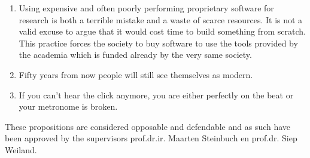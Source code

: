 \documentclass[10pt]{article}%
\newcommand{\mystelling}[1]{%
\item #1
}%
\begin{document}
\begin{enumerate}
\mystelling{Using expensive and often poorly performing proprietary software for research 
is both a terrible mistake and a waste of scarce resources. It is not a valid excuse to 
argue that it would cost time to build something from scratch. This practice forces the
society to buy software to use the tools provided by the academia which is funded already by 
the very same society.}

\mystelling{Fifty years from now people will still see themselves as modern.}

\mystelling{If you can't hear the click anymore, you are either perfectly on the beat or your metronome is broken.}

\end{enumerate}

%
%
%

\vfill \noindent These propositions are considered opposable and defendable and as such have been approved by the supervisors 
prof.dr.ir. Maarten Steinbuch en prof.dr. Siep Weiland.
\newpage

%
%
%
%
%
%
%
%
%
%
%
%
%
%
%
%
%
%
\end{document}
